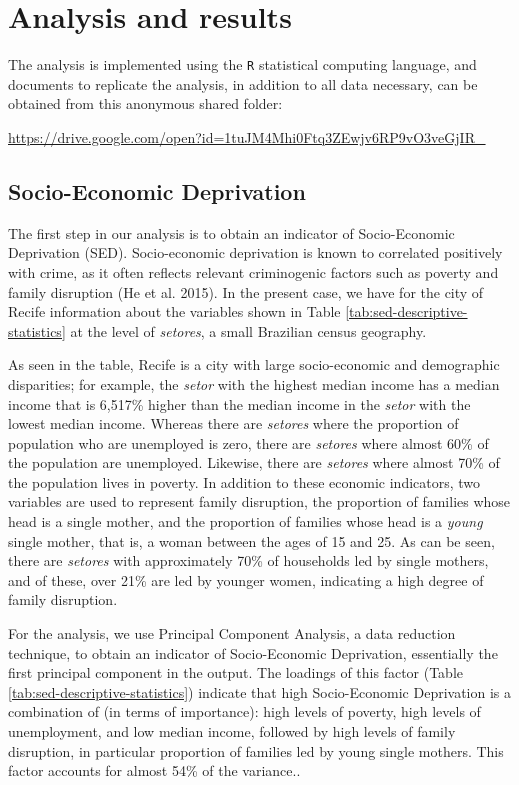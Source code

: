 \documentclass[smallextended]{svjour3}       %
\begin{document}
\hypertarget{results}{%
\section{Analysis and results}\label{results}}

The analysis is implemented using the \texttt{R} statistical computing
language, and documents to replicate the analysis, in addition to all
data necessary, can be obtained from this anonymous shared folder:

\url{https://drive.google.com/open?id=1tuJM4Mhi0Ftq3ZEwjv6RP9vO3veGjIR_}

\hypertarget{socio-economic-deprivation}{%
\subsection{Socio-Economic
Deprivation}\label{socio-economic-deprivation}}

The first step in our analysis is to obtain an indicator of
Socio-Economic Deprivation (SED). Socio-economic deprivation is known to
correlated positively with crime, as it often reflects relevant
criminogenic factors such as poverty and family disruption (He et al.
2015). In the present case, we have for the city of Recife information
about the variables shown in Table \ref{tab:sed-descriptive-statistics}
at the level of \emph{setores}, a small Brazilian census geography.

As seen in the table, Recife is a city with large socio-economic and
demographic disparities; for example, the \emph{setor} with the highest
median income has a median income that is 6,517\% higher than the median
income in the \emph{setor} with the lowest median income. Whereas there
are \emph{setores} where the proportion of population who are unemployed
is zero, there are \emph{setores} where almost 60\% of the population
are unemployed. Likewise, there are \emph{setores} where almost 70\% of
the population lives in poverty. In addition to these economic
indicators, two variables are used to represent family disruption, the
proportion of families whose head is a single mother, and the proportion
of families whose head is a \emph{young} single mother, that is, a woman
between the ages of 15 and 25. As can be seen, there are \emph{setores}
with approximately 70\% of households led by single mothers, and of
these, over 21\% are led by younger women, indicating a high degree of
family disruption.

For the analysis, we use Principal Component Analysis, a data reduction
technique, to obtain an indicator of Socio-Economic Deprivation,
essentially the first principal component in the output. The loadings of
this factor (Table \ref{tab:sed-descriptive-statistics}) indicate that
high Socio-Economic Deprivation is a combination of (in terms of
importance): high levels of poverty, high levels of unemployment, and
low median income, followed by high levels of family disruption, in
particular proportion of families led by young single mothers. This
factor accounts for almost 54\% of the variance..
\end{document}
